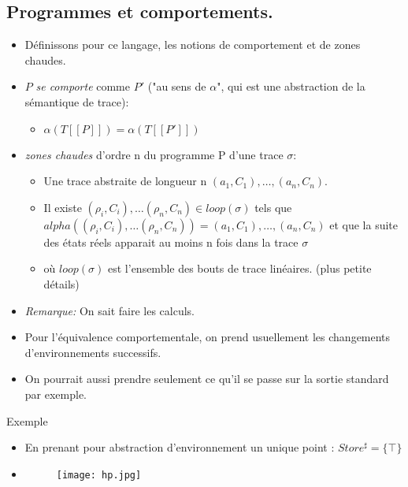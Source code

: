 \documentclass{beamer}
\newcommand\smt[1]{[\![#1]\!]}
\begin{document}
\subsection{Programmes et comportements.}
\begin{frame}
\begin{itemize}
\item Définissons pour ce langage, les notions de comportement et de zones
chaudes.
\pause
\item $P$ \emph{se comporte} comme $P'$ ("au sens de $\alpha$", qui est une
abstraction de la sémantique de
trace):
\begin{itemize}
\item $\alpha(T\smt{P})=\alpha(T\smt{P'})$
\end{itemize}
\pause
\item \emph{zones chaudes} d'ordre n du programme P d'une trace $\sigma$: 
\begin{itemize}
\item Une trace abstraite de longueur n $(a_1,C_1),\dots,(a_n,C_n)$.
\item Il existe $(\rho_i,C_i),\dots(\rho_n,C_n) \in loop(\sigma)$ tels que 
$alpha((\rho_i,C_i),\dots(\rho_n,C_n))= (a_1,C_1),\dots,(a_n,C_n)$ et que la
suite des états réels apparait au moins n fois dans la trace $\sigma$
\item où $loop(\sigma)$ est l'ensemble des bouts de trace linéaires. (plus
petite détails)
\end{itemize}
\pause
\item \emph{Remarque:} On sait faire les calculs.
\end{itemize}
\end{frame}

\begin{frame}
\begin{itemize}
\item Pour l'équivalence comportementale, on prend
usuellement les changements d'environnements successifs. 
\item On pourrait aussi prendre seulement ce qu'il se passe sur la sortie
standard par exemple.
\end{itemize}
\end{frame}


\begin{frame}{Exemple}
\begin{itemize}
\item En prenant pour abstraction d'environnement un unique point :
$Store^\sharp=\{\top\} $
\item
\begin{figure}
\center
\texttt{[image: hp.jpg]}
\end{figure}
\end{itemize}
\end{frame}
\end{document}
